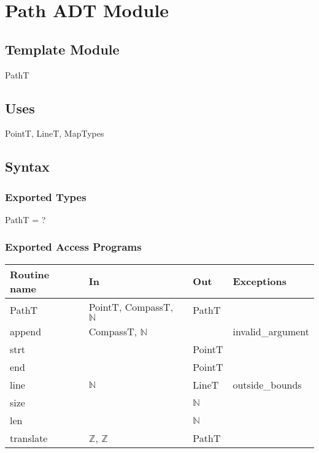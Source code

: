 \documentclass[12pt]{article}
\begin{document}
\newpage

\section* {Path ADT Module}

\subsection*{Template Module}

PathT

\subsection* {Uses}

PointT, LineT, MapTypes

\subsection* {Syntax}

\subsubsection* {Exported Types}

PathT = ?

\subsubsection* {Exported Access Programs}

\begin{tabular}{| l | l | l | l |}
\hline
\textbf{Routine name} & \textbf{In} & \textbf{Out} & \textbf{Exceptions}\\
\hline
PathT & PointT, CompassT, $\mathbb{N}$ & PathT & \\ %
\hline
append & CompassT, $\mathbb{N}$ & & invalid\_argument\\ 
\hline
strt & ~ & PointT & ~\\
\hline
end & ~ & PointT & ~\\
\hline
line & $\mathbb{N}$ & LineT & outside\_bounds\\
\hline
size & ~ & $\mathbb{N}$ & \\
\hline
 len & ~ & $\mathbb{N}$ & ~\\
\hline
translate & $\mathbb{Z}$, $\mathbb{Z}$ & PathT  & ~\\
\hline
\end{tabular}
\end{document}
